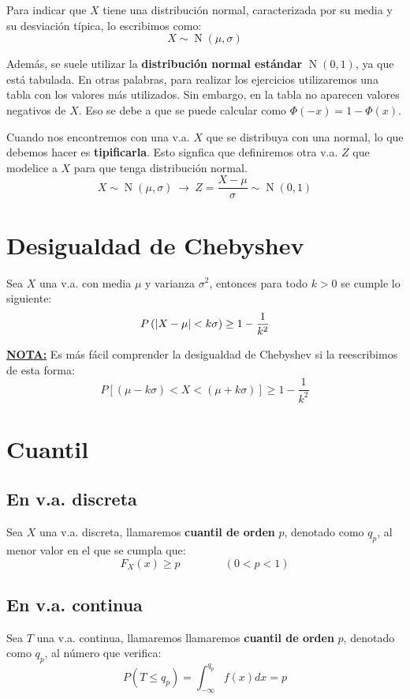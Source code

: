 \documentclass[a4paper]{book}
\numberwithin{figure}{section}
\numberwithin{equation}{subsection}
\numberwithin{figure}{chapter}
\theoremstyle{definition}
\newenvironment{nota}{\underline{\textbf{NOTA:}}}{}
\DeclareMathOperator{\N}{N}
\begin{document}
Para indicar que $X$ tiene una distribución normal, caracterizada por su media y su desviación típica, lo escribimos como: \[X \sim \N(\mu , \sigma ) \]

Además, se suele utilizar la \textbf{distribución normal estándar} $\N(0,1)$, ya que está tabulada. En otras palabras, para realizar los ejercicios utilizaremos una tabla con los valores más utilizados. Sin embargo, en la tabla no aparecen valores negativos de $X$. Eso se debe a que se puede calcular como $\Phi (-x) = 1 - \Phi(x)$.

Cuando nos encontremos con una v.a. $X$ que se distribuya con una normal, lo que debemos hacer es \textbf{tipificarla}. Esto signfica que definiremos otra v.a. $Z$ que modelice a $X$ para que tenga distribución normal.
\[\boxed{X \sim \N(\mu ,\sigma ) \ \longrightarrow \ Z = \frac{X-\mu}{\sigma} \sim \N(0,1)}\]

\section{Desigualdad de Chebyshev}
Sea $X$ una v.a. con media $\mu$ y varianza $\sigma ^2$, entonces para todo $k>0$ se cumple lo siguiente: \[P\left( \abs{X-\mu} < k\sigma \right)\geq 1 - \frac{1}{k^2}\]

\begin{nota}
	Es más fácil comprender la desigualdad de Chebyshev si la reescribimos de esta forma: \[ P\left[ (\mu - k\sigma )< X < (\mu +k\sigma ) \right] \geq 1 - \frac{1}{k^2}\]
\end{nota}


\section{Cuantil}
\subsection*{En v.a. discreta}
Sea $X$ una v.a. discreta, llamaremos \textbf{cuantil de orden} $p$, denotado como $q_p$, al menor valor en el que se cumpla que: \[F_X(x)\geq p \qquad \qquad \left( 0 < p < 1 \right) \]

\subsection*{En v.a. continua}
Sea $T$ una v.a. continua, llamaremos llamaremos \textbf{cuantil de orden} $p$, denotado como $q_p$, al número que verifica: \[P\left( T \leq q_p \right) = \int_{-\infty}^{q_p}{f(x)dx} = p\]
\end{document}
